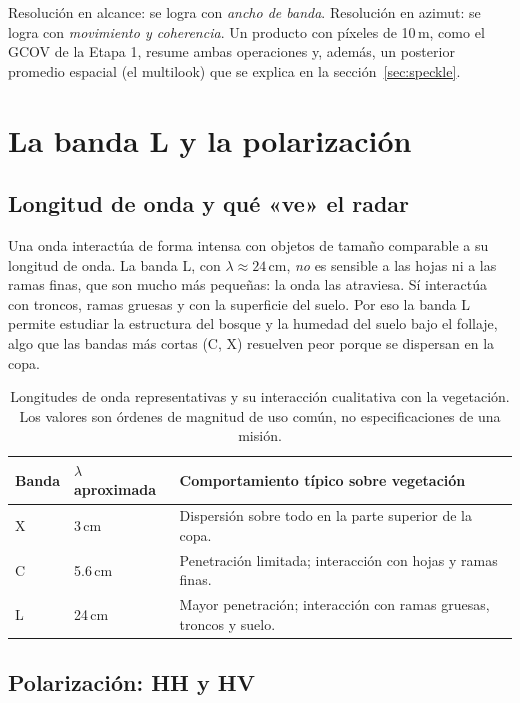 \documentclass[11pt,a4paper]{article}
\begin{document}
\begin{intuicion}
Resolución en alcance: se logra con \emph{ancho de banda}. Resolución en azimut: se logra con \emph{movimiento
y coherencia}. Un producto con píxeles de 10\,m, como el GCOV de la Etapa 1, resume ambas operaciones y,
además, un posterior promedio espacial (el multilook) que se explica en la sección~\ref{sec:speckle}.
\end{intuicion}

\section{La banda L y la polarización}
\label{sec:banda-pol}

\subsection{Longitud de onda y qué «ve» el radar}

Una onda interactúa de forma intensa con objetos de tamaño comparable a su longitud de onda. La banda L, con
$\lambda \approx 24$\,cm, \emph{no} es sensible a las hojas ni a las ramas finas, que son mucho más pequeñas:
la onda las atraviesa. Sí interactúa con troncos, ramas gruesas y con la superficie del suelo. Por eso la banda
L permite estudiar la estructura del bosque y la humedad del suelo bajo el follaje, algo que las bandas más
cortas (C, X) resuelven peor porque se dispersan en la copa.

\begin{table}[htbp]
\centering\small
\begin{tabularx}{\linewidth}{p{.12\linewidth}p{.17\linewidth}X}
\toprule
\textbf{Banda} & \textbf{$\lambda$ aproximada} & \textbf{Comportamiento típico sobre vegetación}\\\midrule
X & 3\,cm & Dispersión sobre todo en la parte superior de la copa.\\
C & 5.6\,cm & Penetración limitada; interacción con hojas y ramas finas.\\
L & 24\,cm & Mayor penetración; interacción con ramas gruesas, troncos y suelo.\\\bottomrule
\end{tabularx}
\caption{Longitudes de onda representativas y su interacción cualitativa con la vegetación. Los valores son
órdenes de magnitud de uso común, no especificaciones de una misión.}
\label{tab:bandas}
\end{table}

\subsection{Polarización: HH y HV}
\end{document}
